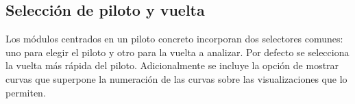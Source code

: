 \documentclass[12pt,a4paper,twoside,openright]{book}
\begin{document}
\begin{umaappendices}
\section{Selección de piloto y vuelta}
Los módulos centrados en un piloto concreto incorporan dos selectores comunes: uno para elegir el piloto y otro para la vuelta a analizar. Por defecto se selecciona la vuelta más rápida del piloto. Adicionalmente
se incluye la opción de mostrar curvas que superpone la numeración de las curvas sobre las visualizaciones que lo permiten.
\end{umaappendices}
\backmatter
\printbibliography[title={Bibliografía}]
\cleardoublepage
\MakeUMABackCover
\end{document}
